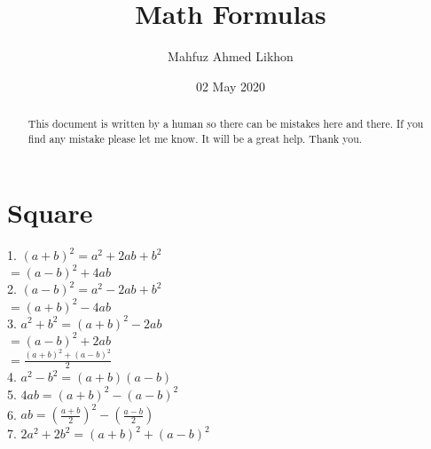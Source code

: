 \documentclass{article}
\title{Math Formulas}
\author{Mahfuz Ahmed Likhon}
\date{02 May 2020}
\begin{document}
\maketitle
\begin{center}
    \begin{abstract}
	This document is written by a human so there can be mistakes here 
	\hspace*{5mm}and there. If you find any mistake please let me know. It will be a 
	\hspace*{5mm}great help. Thank you.
    \end{abstract}
 \end{center}
 
\section{Square}
\large
\hspace*{5mm}1.  $(a+b)^2$\hspace{12.3mm}$ = a^2 + 2ab + b^2$ \\
	\hspace*{35.4mm} $= (a-b)^2+4ab$\\

2. $(a-b)^2 $\hspace{12.3mm}$= a^2-2ab+b^2$\\
	\hspace*{35.4mm} $ = (a+b)^2-4ab$\\
	
3. $a^2+b^2$\hspace{14mm}$ = (a+b)^2 - 2ab$\\
	\hspace*{35.3mm} $ =(a-b)^2+2ab$\\
	\hspace*{35.3mm} $ =\frac{(a+b)^2+(a-b)^2}{2}$\\
	
4. $a^2-b^2 $\hspace{14mm}$= (a+b)(a-b)$\\

5. $4ab$\hspace{21mm}$ = (a+b)^2-(a-b)^2$\\

6. $ab$\hspace{23mm}$ = (\frac{a+b}{2})^2 - (\frac{a-b}{2})$\\

7. $2a^2+2b^2$\hspace{10mm}$ = (a+b)^2+(a-b)^2$ \\
\end{document}
